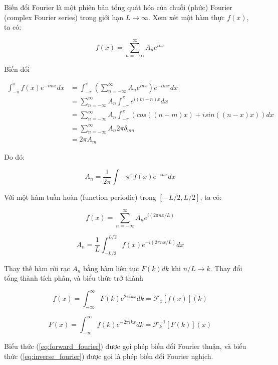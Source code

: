 Biến đổi Fourier là một phiên bản tổng quát hóa của chuỗi (phức) Fourier (complex Fourier series) trong giới hạn $L \rightarrow \infty$. Xem xét một hàm thực $f(x)$, ta có:

\begin{equation}
    f(x) = \sum_{n=-\infty}^{\infty}A_ne^{inx}
\end{equation}


Biến đổi

\begin{equation}
    \begin{aligned}
        \int_{-\pi}^{\pi}f(x)e^{-imx}dx &= \int_{-\pi}^{\pi}\left(\sum_{n=-\infty}^{\infty}A_ne^{inx}\right)e^{-imx}dx\\
        &= \sum_{n=-\infty}^{\infty}A_n\int_{-\pi}^{\pi}e^{i(m-n)x}dx\\
        &= \sum_{n=-\infty}^{\infty}A_n\int_{-\pi}^{\pi}\left(
            cos((n-m)x) + isin((n-x)x)
        \right)dx\\
        &= \sum_{n=-\infty}^{\infty}A_n2\pi\delta_{mn}\\
        &= 2\pi A_{m}
    \end{aligned}
\end{equation}

Do đó:

\begin{equation}
    A_n = \frac{1}{2\pi}\int{-\pi}^{\pi}f(x)e^{-inx}dx
\end{equation}

Với một hàm tuần hoàn (function periodic) trong $[-L/2, L/2]$, ta có:

\begin{equation}
    f(x) = \sum_{n=-\infty}^{\infty}A_ne^{i(2\pi nx/L)}
\end{equation}

\begin{equation}
    A_n = \frac{1}{L}\int_{-L/2}^{L/2}f(x)e^{-i(2\pi nx/L)}dx
\end{equation}

Thay thế hàm rời rạc $A_n$ bằng hàm liên tục $F(k)dk$ khi $n/L \rightarrow k$. Thay đổi tổng thành tích phân, và biểu thức trở thành

\begin{equation}\label{eq:inverse_fourier}
    f(x) = \int_{-\infty}^{\infty}F(k)e^{2\pi ikx}dk = \mathcal{F}_x[f(x)](k)
\end{equation}

\begin{equation}\label{eq:forward_fourier}
    F(x) = \int_{-\infty}^{\infty}f(k)e^{-2\pi ikx}dk = \mathcal{F}_k^{-1}[F(k)](x)
\end{equation}

Biểu thức (\ref{eq:forward_fourier}) được gọi phép biến đổi Fourier thuận, và biểu thức (\ref{eq:inverse_fourier}) được gọi là phép biến đổi Fourier nghịch.

